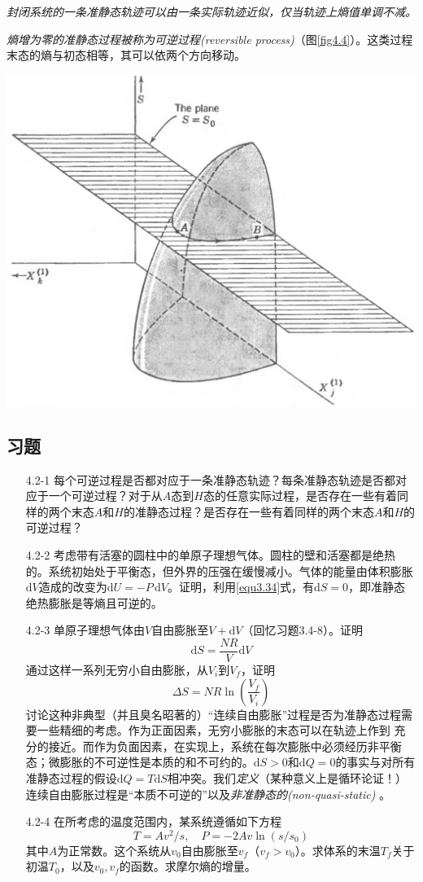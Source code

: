 {\it 封闭系统的一条准静态轨迹可以由一条实际轨迹近似，仅当轨迹上熵值单调不减。}

{\it 熵增为零的准静态过程被称为可逆过程(reversible process)}（图\ref{fig4.4}）。这类过程末态的熵与初态相等，其可以依两个方向移动。

{
	\centering
	\includegraphics[width=.8\textwidth]{Pictures/fig4.4.png}
	\label{fig4.4}
}

\subsection*{习题}
\begin{itemize}
\item[4.2-1] 每个可逆过程是否都对应于一条准静态轨迹？每条准静态轨迹是否都对应于一个可逆过程？对于从$A$态到$H$态的任意实际过程，是否存在一些有着同样的两个末态$A$和$H$的准静态过程？是否存在一些有着同样的两个末态$A$和$H$的可逆过程？
\item[4.2-2] 考虑带有活塞的圆柱中的单原子理想气体。圆柱的壁和活塞都是绝热的。系统初始处于平衡态，但外界的压强在缓慢减小。气体的能量由体积膨胀$\mathrm dV$造成的改变为$\mathrm dU=-P\,\mathrm dV$。证明，利用\eqref{equ3.34}式，有$\mathrm dS=0$，即准静态绝热膨胀是等熵且可逆的。
\item[4.2-3] 单原子理想气体由$V$自由膨胀至$V+\mathrm dV$（回忆习题3.4-8）。证明
\[
\mathrm dS = \frac{NR}{V}\mathrm dV
\]
通过这样一系列无穷小自由膨胀，从$V_i$到$V_f$，证明
\[
\Delta S = NR\ln(\frac{V_f}{V_i})
\]
讨论这种非典型（并且臭名昭著的）“连续自由膨胀”过程是否为准静态过程需要一些精细的考虑。作为正面因素，无穷小膨胀的末态可以在轨迹上作到%
%
充分的接近。而作为负面因素，在实现上，系统在每次膨胀中必须经历非平衡态；微膨胀的不可逆性是本质的和不可约的。$\mathrm dS>0$和$\mathrm dQ=0$的事实与对所有准静态过程的假设$\mathrm dQ=T\mathrm dS$相冲突。我们{\it 定义}（某种意义上是循环论证！）连续自由膨胀过程是“本质不可逆的”以及{\it 非准静态的(non-quasi-static)}%
。
\item[4.2-4] 在所考虑的温度范围内，某系统遵循如下方程
\[
T=Av^2/s, \quad P=-2Av\ln(s/s_0)
\]
其中$A$为正常数。这个系统从$v_0$自由膨胀至$v_f$（$v_f>v_0$）。求体系的末温$T_f$关于初温$T_0$，以及$v_0,v_f$的函数。求摩尔熵的增量。
\end{itemize}

